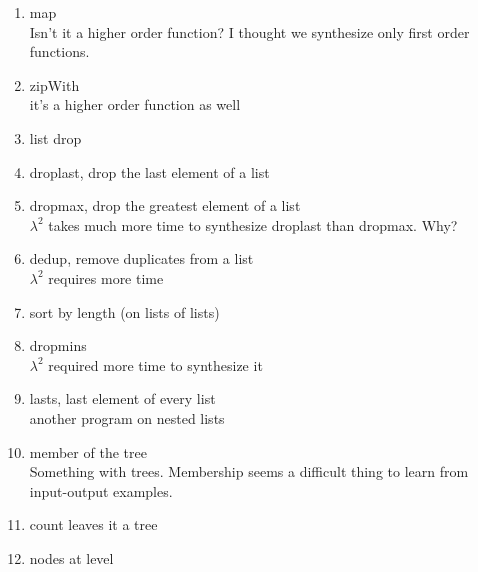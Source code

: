 \begin{enumerate}
%
	\item map \\
	Isn't it a higher order function? I thought we synthesize only first order functions.
%
	\item zipWith \\
	it's a higher order function as well
%
	\item list drop
%
	\item droplast, drop the last element of a list
%
	\item dropmax, drop the greatest element of a list\\
	$\lambda^2$ takes much more time to synthesize droplast than dropmax. Why?
%
	\item dedup, remove duplicates from a list \\
	$\lambda^2$ requires more time
%
	\item sort by length (on lists of lists)
%
	\item dropmins \\
	$\lambda^2$ required more time to synthesize it
%
	\item lasts, last element of every list \\
	another program on nested lists
%
	\item member of the tree\\
	Something with trees. Membership seems a difficult thing to learn from input-output examples.
%
	\item count leaves it a tree
%
	\item nodes at level

\end{enumerate}




